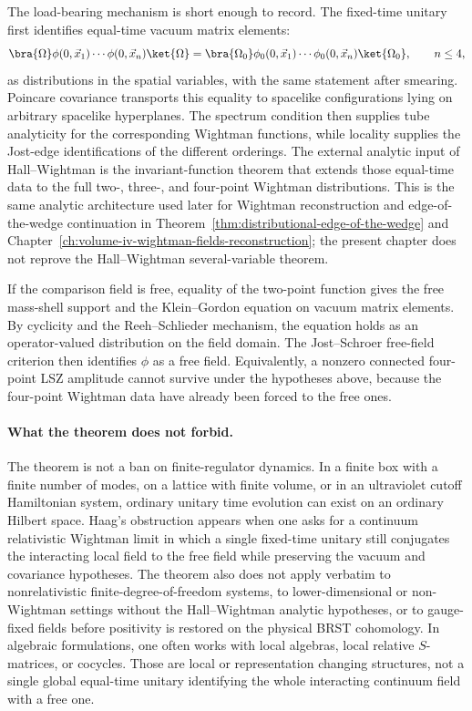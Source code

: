 The load-bearing mechanism is short enough to record.  The fixed-time unitary
first identifies equal-time vacuum matrix elements:
\[
  \bra{\Omega}\phi(0,\vec x_1)\cdots\phi(0,\vec x_n)\ket{\Omega}
  =
  \bra{\Omega_0}\phi_0(0,\vec x_1)\cdots\phi_0(0,\vec x_n)\ket{\Omega_0},
  \qquad n\le4,
\]
as distributions in the spatial variables, with the same statement after
smearing.  Poincare covariance transports this equality to spacelike
configurations lying on arbitrary spacelike hyperplanes.  The spectrum condition
then supplies tube analyticity for the corresponding Wightman functions, while
locality supplies the Jost-edge identifications of the different orderings.  The
external analytic input of Hall--Wightman is the invariant-function theorem that
extends those equal-time data to the full two-, three-, and four-point
Wightman distributions.  This is the same analytic architecture used later for
Wightman reconstruction and edge-of-the-wedge continuation in
Theorem~\ref{thm:distributional-edge-of-the-wedge} and
Chapter~\ref{ch:volume-iv-wightman-fields-reconstruction}; the present chapter
does not reprove the Hall--Wightman several-variable theorem.

If the comparison field is free, equality of the two-point function gives the
free mass-shell support and the Klein--Gordon equation on vacuum matrix
elements.  By cyclicity and the Reeh--Schlieder mechanism, the equation holds as
an operator-valued distribution on the field domain.  The Jost--Schroer
free-field criterion then identifies \(\phi\) as a free field.  Equivalently, a
nonzero connected four-point LSZ amplitude cannot survive under the hypotheses
above, because the four-point Wightman data have already been forced to the free
ones.

\paragraph{What the theorem does not forbid.}
The theorem is not a ban on finite-regulator dynamics.  In a finite box with a
finite number of modes, on a lattice with finite volume, or in an ultraviolet
cutoff Hamiltonian system, ordinary unitary time evolution can exist on an
ordinary Hilbert space.  Haag's obstruction appears when one asks for a
continuum relativistic Wightman limit in which a single fixed-time unitary still
conjugates the interacting local field to the free field while preserving the
vacuum and covariance hypotheses.  The theorem also does not apply verbatim to
nonrelativistic finite-degree-of-freedom systems, to lower-dimensional or
non-Wightman settings without the Hall--Wightman analytic hypotheses, or to
gauge-fixed fields before positivity is restored on the physical BRST
cohomology.  In algebraic formulations, one often works with local algebras,
local relative \(S\)-matrices, or cocycles.  Those are local or representation
changing structures, not a single global equal-time unitary identifying the
whole interacting continuum field with a free one.

